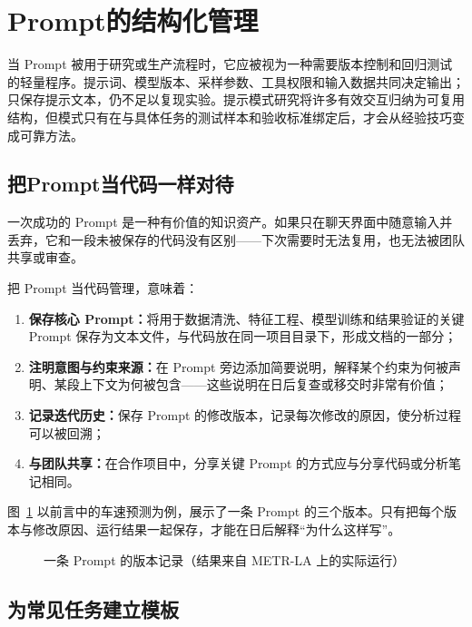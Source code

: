 \section{Prompt的结构化管理}

当 Prompt 被用于研究或生产流程时，它应被视为一种需要版本控制和回归测试的轻量程序。提示词、模型版本、采样参数、工具权限和输入数据共同决定输出；只保存提示文本，仍不足以复现实验。提示模式研究将许多有效交互归纳为可复用结构\cite{white2023prompt}，但模式只有在与具体任务的测试样本和验收标准绑定后，才会从经验技巧变成可靠方法。

\subsection{把Prompt当代码一样对待}

一次成功的 Prompt 是一种有价值的知识资产。如果只在聊天界面中随意输入并丢弃，它和一段未被保存的代码没有区别——下次需要时无法复用，也无法被团队共享或审查。

把 Prompt 当代码管理，意味着：

\begin{enumerate}
  \item \textbf{保存核心 Prompt：}将用于数据清洗、特征工程、模型训练和结果验证的关键 Prompt 保存为文本文件，与代码放在同一项目目录下，形成文档的一部分；
  \item \textbf{注明意图与约束来源：}在 Prompt 旁边添加简要说明，解释某个约束为何被声明、某段上下文为何被包含——这些说明在日后复查或移交时非常有价值；
  \item \textbf{记录迭代历史：}保存 Prompt 的修改版本，记录每次修改的原因，使分析过程可以被回溯；
  \item \textbf{与团队共享：}在合作项目中，分享关键 Prompt 的方式应与分享代码或分析笔记相同。
\end{enumerate}

图~\ref{fig:ch02_versions} 以前言中的车速预测为例，展示了一条 Prompt 的三个版本。只有把每个版本与修改原因、运行结果一起保存，才能在日后解释“为什么这样写”。

\begin{figure}[H]
  \centering
  \caption{一条 Prompt 的版本记录（结果来自 METR-LA 上的实际运行）}
  \label{fig:ch02_versions}
\end{figure}

\subsection{为常见任务建立模板}

